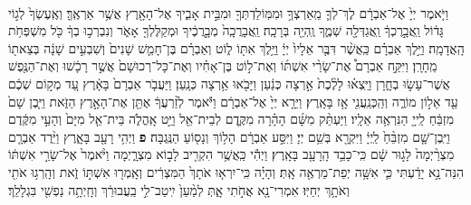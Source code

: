 \documentclass[twoside, openany, parskip=half, 11pt]{book}
\begin{document}
\begin{footnotesize}
\begin{multicols}{2}
\\
 וַיֹּ֤אמֶר יְיָ֙ אֶל־אַבְרָ֔ם לֶךְ־לְךָ֛ מֵֽאַרְצְךָ֥ וּמִמּֽוֹלַדְתְּךָ֖ וּמִבֵּ֣ית אָבִ֑יךָ אֶל־הָאָ֖רֶץ אֲשֶׁ֥ר אַרְאֶֽךָּ׃ וְאֶֽעֶשְׂךָ֙ לְג֣וֹי גָּד֔וֹל וַֽאֲבָ֣רֶכְךָ֔ וַֽאֲגַדְּלָ֖ה שְׁמֶ֑ךָ וֶֽהְיֵ֖ה בְּרָכָֽה׃ וַֽאֲבָרֲכָֽה֙ מְבָ֣רֲכֶ֔יךָ וּמְקַלֶּלְךָ֖ אָאֹ֑ר וְנִבְרְכ֣וּ בְךָ֔ כֹּ֖ל מִשְׁפְּחֹ֥ת הָֽאֲדָמָֽה׃  וַיֵּ֣לֶךְ אַבְרָ֗ם כַּֽאֲשֶׁ֨ר דִּבֶּ֤ר אֵלָיו֙ יְיָ֔ וַיֵּ֥לֶךְ אִתּ֖וֹ ל֑וֹט וְאַבְרָ֗ם בֶּן־חָמֵ֤שׁ שָׁנִים֙ וְשִׁבְעִ֣ים שָׁנָ֔ה בְּצֵאת֖וֹ מֵֽחָרָֽן׃ וַיִּקַּ֣ח אַבְרָם֩ אֶת־שָׂרַ֨י אִשְׁתּ֜וֹ וְאֶת־ל֣וֹט בֶּן־אָחִ֗יו וְאֶת־כָּל־רְכוּשָׁם֙ אֲשֶׁ֣ר רָכָ֔שׁוּ וְאֶת־הַנֶּ֖פֶשׁ אֲשֶׁר־עָשׂ֣וּ בְחָ֑רָן וַיֵּֽצְא֗וּ לָלֶ֨כֶת֙ אַ֣רְצָה כְּנַ֔עַן וַיָּבֹ֖אוּ אַ֥רְצָה כְּנָֽעַן׃ וַיַּעֲבֹ֤ר אַבְרָם֙ בָּאָ֔רֶץ עַ֚ד מְק֣וֹם שְׁכֶ֔ם עַ֖ד אֵל֣וֹן מוֹרֶ֑ה וְהַֽכְּנַֽעֲנִ֖י אָ֥ז בָּאָֽרֶץ׃ וַיֵּרָ֤א יְיָ֙ אֶל־אַבְרָ֔ם וַיֹּ֕אמֶר לְזַ֨רְעֲךָ֔ אֶתֵּ֖ן אֶת־הָאָ֣רֶץ הַזֹּ֑את וַיִּ֤בֶן שָׁם֙ מִזְבֵּ֔חַ לַֽייָ֖ הַנִּרְאֶ֥ה אֵלָֽיו׃ וַיַּעְתֵּ֨ק מִשָּׁ֜ם הָהָ֗רָה מִקֶּ֛דֶם לְבֵית־אֵ֖ל וַיֵּ֣ט אָֽהֳלֹ֑ה בֵּית־אֵ֤ל מִיָּם֙ וְהָעַ֣י מִקֶּ֔דֶם וַיִּֽבֶן־שָׁ֤ם מִזְבֵּ֨חַ֙ לַֽיְיָ֔ וַיִּקְרָ֖א בְּשֵׁ֥ם יְיָ׃ וַיִּסַּ֣ע אַבְרָ֔ם הָל֥וֹךְ וְנָס֖וֹעַ הַנֶּֽגְבָּה׃ \textbf{פ} 
 וַיְהִ֥י רָעָ֖ב בָּאָ֑רֶץ וַיֵּ֨רֶד אַבְרָ֤ם מִצְרַ֨יְמָה֙ לָג֣וּר שָׁ֔ם כִּֽי־כָבֵ֥ד הָֽרָעָ֖ב בָּאָֽרֶץ׃ וַיְהִ֕י כַּֽאֲשֶׁ֥ר הִקְרִ֖יב לָב֣וֹא מִצְרָ֑יְמָה וַיֹּ֨אמֶר֙ אֶל־שָׂרַ֣י אִשְׁתּ֔וֹ הִנֵּה־נָ֣א יָדַ֔עְתִּי כִּ֛י אִשָּׁ֥ה יְפַת־מַרְאֶ֖ה אָֽתְּ׃ וְהָיָ֗ה כִּֽי־יִרְא֤וּ אֹתָךְ֙ הַמִּצְרִ֔ים וְאָֽמְר֖וּ אִשְׁתּ֣וֹ זֹ֑את וְהָֽרְג֥וּ אֹתִ֖י וְאֹתָ֥ךְ יְחַיּֽוּ׃ אִמְרִי־נָ֖א אֲחֹ֣תִי אָ֑תְּ לְמַ֨עַן֙ יִֽיטַב־לִ֣י בַֽעֲבוּרֵ֔ךְ וְחָֽיְתָ֥ה נַפְשִׁ֖י בִּגְלָלֵֽךְ׃


\end{multicols}
\end{footnotesize}
\end{document}
